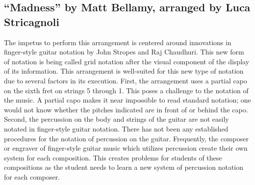 \documentclass{tufte-handout}
\newcommand{\textls}[2][5]{%
    \begingroup\addfontfeatures{LetterSpace=#1}#2\endgroup
  }
\renewcommand{\smallcapsspacing}[1]{\textls[10]{#1}}
\renewcommand{\textsc}[1]{\smallcapsspacing{\textsmallcaps{#1}}}
\begin{document}

\subsection*{``Madness'' by Matt Bellamy, arranged by Luca Stricagnoli}
The impetus to perform this arrangement is centered around innovations in finger-style guitar notation by John Stropes and Raj Chaudhuri. This new form of notation is being called grid notation after the visual component of the display of its information. This arrangement is well-suited for this new type of notation due to several factors in its execution. First, the arrangement uses a partial capo on the sixth fret on strings 5 through 1. This poses a challenge to the notation of the music. A partial capo makes it near impossible to read standard notation; one would not know whether the pitches indicated are in front of or behind the capo. Second, the percussion on the body and strings of the guitar are not easily notated in finger-style guitar notation. There has not been any established procedures for the notation of percussion on the guitar. Frequently, the composer or engraver of finger-style guitar music which utilizes percussion create their own system for each composition. This creates problems for students of these compositions as the student needs to learn a new system of percussion notation for each composer.
\end{document}
